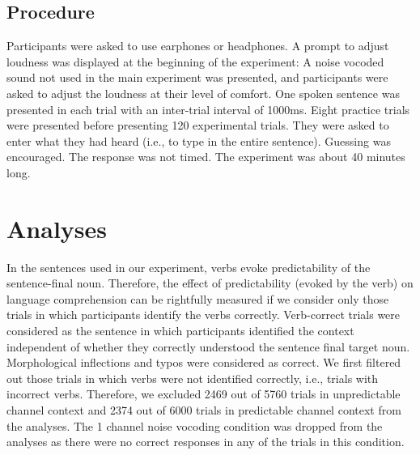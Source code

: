 \documentclass[a4paper, nobind]{templates/ociamthesis}
\begin{document}
\hypertarget{procedure-2}{%
\subsection{Procedure}\label{procedure-2}}

Participants were asked to use earphones or headphones.
A prompt to adjust loudness was displayed at the beginning of the experiment:
A noise vocoded sound not used in the main experiment was presented, and participants were asked to adjust the loudness at their level of comfort.
One spoken sentence was presented in each trial with an inter-trial interval of 1000ms.
Eight practice trials were presented before presenting 120 experimental trials.
They were asked to enter what they had heard (i.e., to type in the entire sentence).
Guessing was encouraged.
The response was not timed.
The experiment was about 40 minutes long.

\hypertarget{analyses-2}{%
\section{Analyses}\label{analyses-2}}

In the sentences used in our experiment, verbs evoke predictability of the sentence-final noun.
Therefore, the effect of predictability (evoked by the verb) on language comprehension can be rightfully measured if we consider only those trials in which participants identify the verbs correctly.
Verb-correct trials were considered as the sentence in which participants identified the context independent of whether they correctly understood the sentence final target noun.
Morphological inflections and typos were considered as correct.
We first filtered out those trials in which verbs were not identified correctly, i.e., trials with incorrect verbs.
Therefore, we excluded 2469 out of 5760 trials in unpredictable channel context and 2374 out of 6000 trials in predictable channel context from the analyses.
The 1 channel noise vocoding condition was dropped from the analyses as there were no correct responses in any of the trials in this condition.
\end{document}
